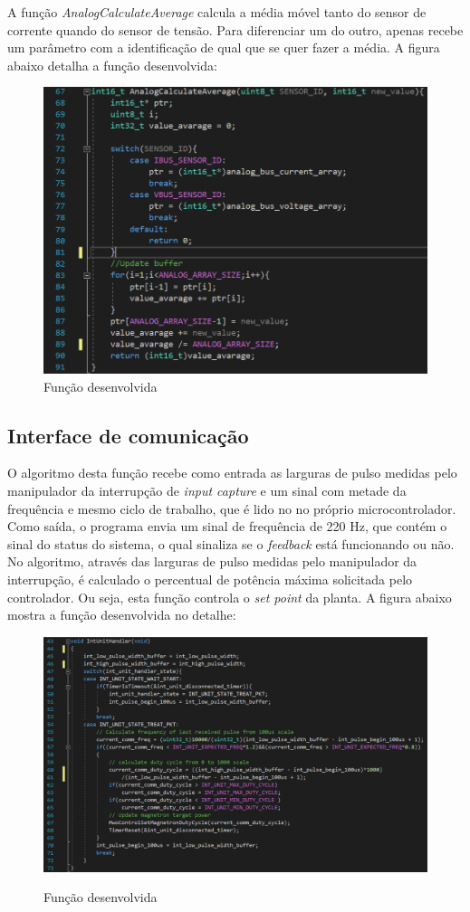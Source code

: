 A função \textit{AnalogCalculateAverage} calcula a média móvel tanto do sensor de corrente quando do sensor de tensão. Para diferenciar um do outro, apenas recebe um parâmetro com a identificação de qual que se quer fazer a média. A figura abaixo detalha a função desenvolvida:

\begin{figure}[H]
    \centering
    \includegraphics[width=1\textwidth]{./dados/figuras/func_average}
    \caption{Função desenvolvida}
    \label{fig:figura-func_average}
\end{figure}


\subsection{Interface de comunicação}
O algoritmo desta função recebe como entrada as larguras de pulso medidas pelo manipulador da interrupção de \textit{input capture} e um sinal com metade da frequência e mesmo ciclo de trabalho, que é lido no no próprio microcontrolador. Como saída, o programa envia um sinal de frequência de 220 Hz, que contém o sinal do status do sistema, o qual sinaliza se o \textit{feedback} está funcionando ou não. No algoritmo, através das larguras de pulso medidas pelo manipulador da interrupção, é calculado o percentual de potência máxima solicitada pelo controlador. Ou seja, esta função controla o \textit{set point} da planta. A figura abaixo mostra a função desenvolvida no detalhe:

\begin{figure}[H]
    \centering
    \caption{Função desenvolvida}
    \includegraphics[width=1\textwidth]{./dados/figuras/func_comm}
    \label{fig:figura-func_comm}
\end{figure}